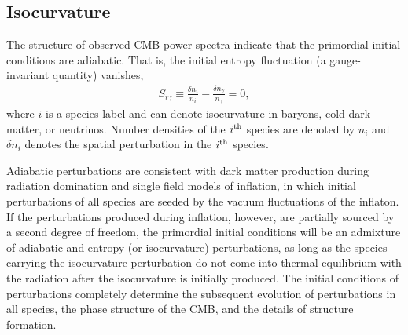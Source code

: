 


\subsection{Isocurvature}
The structure of observed CMB power spectra indicate that the primordial initial conditions are adiabatic. That is, the initial entropy fluctuation (a gauge-invariant quantity) vanishes,
\begin{align}
S_{i \gamma}\equiv \frac{\delta n_{i}}{n_{i}}-\frac{\delta n_{\gamma}}{n_{\gamma}} =0,\end{align} where $i$ is a species label and can denote isocurvature in baryons, cold dark matter, or neutrinos. Number densities of the $i^{\rm th}$ species are denoted by $n_{i}$ and $\delta n_{i}$ denotes the spatial perturbation in the $i^{\rm th}$ species.


Adiabatic perturbations are consistent with dark matter production during radiation domination and single field models of inflation, in which initial perturbations of all species are seeded by the vacuum fluctuations of the inflaton. If the perturbations produced during inflation, however, are partially sourced by a second degree of freedom, the primordial initial conditions will be an admixture of adiabatic and entropy (or isocurvature) perturbations, as long as the species carrying the isocurvature perturbation do not come into thermal equilibrium with the radiation after the isocurvature is initially produced. The initial conditions of perturbations completely determine the subsequent evolution of perturbations in all species, the phase structure of the CMB, and the details of structure formation.

